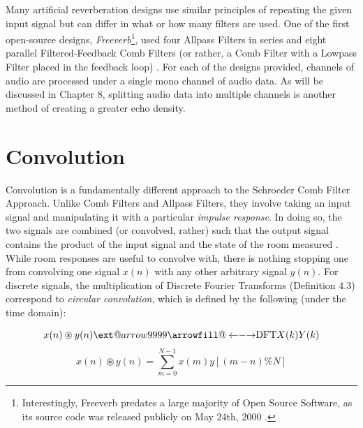 Many artificial reverberation designs use similar principles of repeating the given input signal but can differ in what or how many filters are used. One of the first open-source designs, \textit{Freeverb}\footnote{Interestingly, Freeverb predates a large majority of Open Source Software, as its source code was released publicly on May 24th, 2000 \cite{freeverb}.}, used four Allpass Filters in series and eight parallel Filtered-Feedback Comb Filters (or rather, a Comb Filter with a Lowpass Filter placed in the feedback loop) \cite{PASPWEB2010}. For each of the designs provided, channels of audio are processed under a single mono channel of audio data. As will be discussed in Chapter 8, splitting audio data into multiple channels is another method of creating a greater echo density.

\section{Convolution}
Convolution is a fundamentally different approach to the Schroeder Comb Filter Approach. Unlike Comb Filters and Allpass Filters, they involve taking an input signal and manipulating it with a particular \textit{impulse response}. In doing so, the two signals are combined (or convolved, rather) such that the output signal contains the product of the input signal and the state of the room measured \cite{pirkle2019designing}. While room responses are useful to convolve with, there is nothing stopping one from convolving one signal $x(n)$ with any other arbitrary signal $y(n)$. For discrete signals, the multiplication of Discrete Fourier Transforms (Definition 4.3) correspond to \textit{circular convolution}, which is defined by the following (under the time domain):

\makeatletter
\newcommand\xleftrightarrow[2][]{%
  \ext@arrow 9999{\longleftrightarrowfill@}{#1}{#2}}
\newcommand\longleftrightarrowfill@{%
  \arrowfill@\leftarrow\relbar\rightarrow}
\makeatother

\begin{defn}\label{def-cir-FT}
	\begin{equation}\label{eq-cir-FT)}
	x(n) \circledast y(n) \xleftrightarrow{\text{DFT}} X(k)Y(k)
	\end{equation}
	\begin{equation}\label{next-ig}
	x(n) \circledast y(n) = \sum_{m=0}^{N-1} x(m) y[(m - n) \% N]
	\end{equation}
\end{defn}

